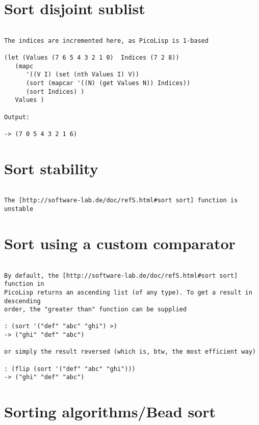 \section*{Sort disjoint sublist}

\begin{verbatim}

The indices are incremented here, as PicoLisp is 1-based

(let (Values (7 6 5 4 3 2 1 0)  Indices (7 2 8))
   (mapc
      '((V I) (set (nth Values I) V))
      (sort (mapcar '((N) (get Values N)) Indices))
      (sort Indices) )
   Values )

Output:

-> (7 0 5 4 3 2 1 6)

\end{verbatim}

\section*{Sort stability}

\begin{verbatim}

The [http://software-lab.de/doc/refS.html#sort sort] function is unstable

\end{verbatim}

\section*{Sort using a custom comparator}

\begin{verbatim}

By default, the [http://software-lab.de/doc/refS.html#sort sort] function in
PicoLisp returns an ascending list (of any type). To get a result in descending
order, the "greater than" function can be supplied

: (sort '("def" "abc" "ghi") >)
-> ("ghi" "def" "abc")

or simply the result reversed (which is, btw, the most efficient way)

: (flip (sort '("def" "abc" "ghi")))
-> ("ghi" "def" "abc")

\end{verbatim}

\section*{Sorting algorithms/Bead sort}

